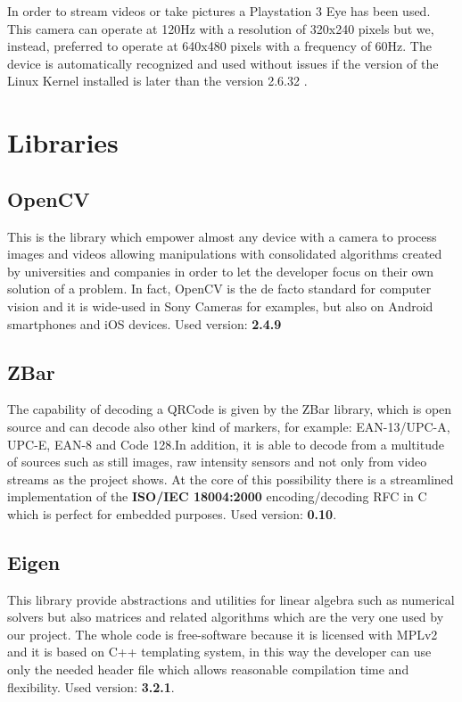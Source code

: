 In order to stream videos or take pictures a Playstation 3 Eye has been used.
This camera can operate at 120Hz with a resolution of 320x240 pixels but we, instead, preferred to operate at 640x480 pixels with a frequency of 60Hz.
The device is automatically recognized and used without issues if the version of the Linux Kernel installed is later than the version 2.6.32 .
 

\section{Libraries}

\subsection{OpenCV}
This is the library which empower almost any device with a camera to process images and videos allowing manipulations with consolidated algorithms created by universities and companies in order to let the developer focus on their own solution of a problem.
In fact, OpenCV is the de facto standard for computer vision and it is wide-used in Sony Cameras for examples, but also on Android smartphones and iOS devices. 
\newline Used version: \textbf{2.4.9}

\subsection{ZBar}

The capability of decoding a QRCode is given by the ZBar library, which is open source and can decode also other kind of markers, for example: EAN-13/UPC-A, UPC-E, EAN-8 and Code 128.In addition, it is able to decode from a multitude of sources such as still images, raw intensity sensors and not only from video streams as the project shows. At the core of this possibility there is a streamlined implementation of the \textbf{ISO/IEC 18004:2000} encoding/decoding RFC in C which is perfect for embedded purposes.
\newline Used version: \textbf{0.10}.

\subsection{Eigen}
This library provide abstractions and utilities for linear algebra such as numerical solvers but also matrices and related algorithms which are the very one used by our project.
The whole code is free-software because it is licensed with MPLv2 and it is based on C++ templating system, in this way the developer can use only the needed header file which allows reasonable compilation time and flexibility.\cite{eigeninfo}
\newline Used version: \textbf{3.2.1}.
 

